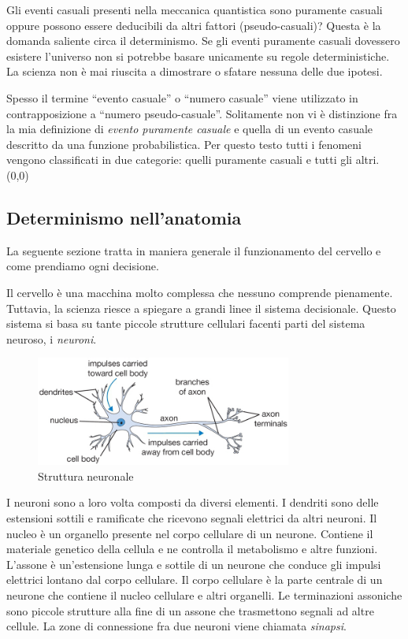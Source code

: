 \documentclass[a4paper, 12pt]{article}
\newcommand{\quotes}[1]{``#1''}
\newcommand{\ownleft}[0]{%
    \makebox(0,0){
        \stackon[-8pt]{\phantom{A}}{
            \begin{tikzpicture}
                \fill (0,0) -- (0.3,0) -- ++(0,0.05) -- (0,0.05);
                \fill (0.3,0) -- ++(0,0.3) -- (0.25,0.3) -- (0.25,0.05);
            \end{tikzpicture}
        }
    }
}
\begin{document}
Gli eventi casuali presenti nella meccanica quantistica sono puramente casuali
oppure possono essere deducibili da altri fattori (pseudo-casuali)?
Questa è la domanda saliente circa il determinismo.
Se gli eventi puramente casuali dovessero esistere l'universo non si potrebbe basare unicamente
su regole deterministiche.
La scienza non è mai riuscita a dimostrare o sfatare nessuna delle due ipotesi.

Spesso il termine \quotes{evento casuale} o \quotes{numero casuale} viene utilizzato
in contrapposizione a \quotes{numero pseudo-casuale}.
Solitamente non vi è distinzione fra la mia definizione di \textit{evento puramente casuale}
e quella di un evento casuale descritto da una funzione probabilistica.
Per questo testo tutti i fenomeni vengono classificati in due categorie:
quelli puramente casuali e tutti gli altri.%
\ownleft{}

\subsection{Determinismo nell'anatomia}

La seguente sezione tratta in maniera generale il funzionamento del cervello
e come prendiamo ogni decisione.

Il cervello è una macchina molto complessa che nessuno
comprende pienamente. Tuttavia, la scienza riesce a spiegare a grandi linee
il sistema decisionale. Questo sistema si basa su tante piccole strutture cellulari
facenti parti del sistema neuroso, i \textit{neuroni}.

\begin{figure}[ht]
    \centering
    \includegraphics[width=0.75\textwidth]{neuron.png}
    \caption{Struttura neuronale}
\end{figure}

I neuroni\cite{neuron} sono a loro volta composti da diversi elementi.
I dendriti sono delle estensioni sottili e ramificate che ricevono segnali elettrici da altri neuroni.
Il nucleo è un organello presente nel corpo cellulare di un neurone.
Contiene il materiale genetico della cellula e ne controlla il metabolismo e
altre funzioni.
L'assone è un'estensione lunga e sottile di un neurone che conduce gli impulsi elettrici
lontano dal corpo cellulare.
Il corpo cellulare è la parte centrale di un neurone che contiene
il nucleo cellulare e altri organelli.
Le terminazioni assoniche sono piccole strutture alla fine di un assone che trasmettono
segnali ad altre cellule. La zone di connessione
fra due neuroni viene chiamata \textit{sinapsi}.
\end{document}
